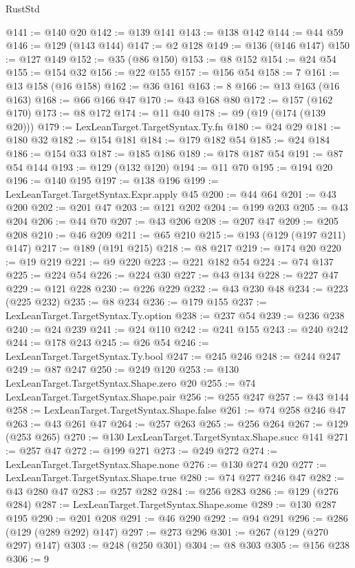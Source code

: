 \begin{lexlean}{RustStd}
\begin{coremodule}
@141 := @140 @20
@142 := @139 @141
@143 := @138 @142
@144 := @44 @59
@146 := @129 (@143 @144)
@147 := @2 @128
@149 := @136 (@146 @147)
@150 := @127 @149
@152 := @35 (@86 @150)
@153 := @8 @152
@154 := @24 @54
@155 := @154 @32
@156 := @22 @155
@157 := @156 @54
@158 := 7
@161 := @13 @158 (@16 @158)
@162 := @36 @161
@163 := 8
@166 := @13 @163 (@16 @163)
@168 := @66 @166 @47
@170 := @43 @168 @80
@172 := @157 (@162 @170)
@173 := @8 @172
@174 := @11 @40
@178 := @9 (@19 (@174 (@139 @20)))
@179 := LexLeanTarget.TargetSyntax.Ty.fn
@180 := @24 @29
@181 := @180 @32
@182 := @154 @181
@184 := @179 @182 @54
@185 := @24 @184
@186 := @154 @33
@187 := @185 @186
@189 := @178 @187 @54
@191 := @87 @54 @144
@193 := @129 (@132 @120)
@194 := @11 @70
@195 := @194 @20
@196 := @140 @195
@197 := @138 @196
@199 := LexLeanTarget.TargetSyntax.Expr.apply @45
@200 := @44 @64
@201 := @43 @200
@202 := @201 @47
@203 := @121 @202
@204 := @199 @203
@205 := @43 @204
@206 := @44 @70
@207 := @43 @206
@208 := @207 @47
@209 := @205 @208
@210 := @46 @209
@211 := @65 @210
@215 := @193 (@129 (@197 @211) @147)
@217 := @189 (@191 @215)
@218 := @8 @217
@219 := @174 @20
@220 := @19 @219
@221 := @9 @220
@223 := @221 @182 @54
@224 := @74 @137
@225 := @224 @54
@226 := @224 @30
@227 := @43 @134
@228 := @227 @47
@229 := @121 @228
@230 := @226 @229
@232 := @43 @230 @48
@234 := @223 (@225 @232)
@235 := @8 @234
@236 := @179 @155
@237 := LexLeanTarget.TargetSyntax.Ty.option
@238 := @237 @54
@239 := @236 @238
@240 := @24 @239
@241 := @24 @110
@242 := @241 @155
@243 := @240 @242
@244 := @178 @243
@245 := @26 @54
@246 := LexLeanTarget.TargetSyntax.Ty.bool
@247 := @245 @246
@248 := @244 @247
@249 := @87 @247
@250 := @249 @120
@253 := @130 LexLeanTarget.TargetSyntax.Shape.zero @20
@255 := @74 LexLeanTarget.TargetSyntax.Shape.pair
@256 := @255 @247
@257 := @43 @144
@258 := LexLeanTarget.TargetSyntax.Shape.false
@261 := @74 @258 @246 @47
@263 := @43 @261 @47
@264 := @257 @263
@265 := @256 @264
@267 := @129 (@253 @265)
@270 := @130 LexLeanTarget.TargetSyntax.Shape.succ @141
@271 := @257 @47
@272 := @199 @271
@273 := @249 @272
@274 := LexLeanTarget.TargetSyntax.Shape.none
@276 := @130 @274 @20
@277 := LexLeanTarget.TargetSyntax.Shape.true
@280 := @74 @277 @246 @47
@282 := @43 @280 @47
@283 := @257 @282
@284 := @256 @283
@286 := @129 (@276 @284)
@287 := LexLeanTarget.TargetSyntax.Shape.some
@289 := @130 @287 @195
@290 := @201 @208
@291 := @46 @290
@292 := @94 @291
@296 := @286 (@129 (@289 @292) @147)
@297 := @273 @296
@301 := @267 (@129 (@270 @297) @147)
@303 := @248 (@250 @301)
@304 := @8 @303
@305 := @156 @238
@306 := 9

\end{coremodule}
\end{lexlean}
